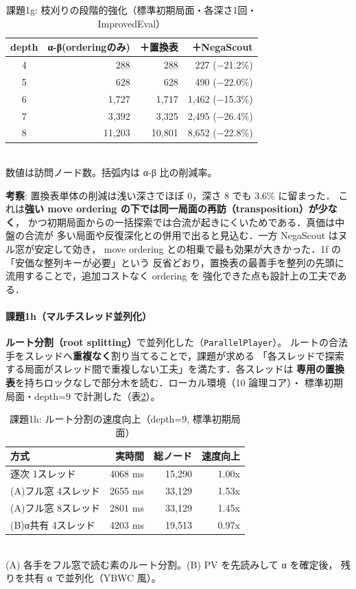 \documentclass[11pt,a4j]{ujarticle} %
\begin{document}
\begin{table}[h]\center
\caption{課題1g: 枝刈りの段階的強化（標準初期局面・各深さ1回・ImprovedEval）}\label{tab:1g}
\begin{tabular}{c|r|r|r}
depth & α-β(orderingのみ) & ＋置換表 & ＋NegaScout \\ \hline\hline
4 &    288 &    288 &   227 ($-$21.2\%) \\
5 &    628 &    628 &   490 ($-$22.0\%) \\
6 &  1{,}727 &  1{,}717 & 1{,}462 ($-$15.3\%) \\
7 &  3{,}392 &  3{,}325 & 2{,}495 ($-$26.4\%) \\
8 & 11{,}203 & 10{,}801 & 8{,}652 ($-$22.8\%) \\
\end{tabular}\\
{\small 数値は訪問ノード数。括弧内は α-β 比の削減率。}
\end{table}

\textbf{考察}: 置換表単体の削減は浅い深さでほぼ 0，深さ 8 でも 3.6\% に留まった．
これは\textbf{強い move ordering の下では同一局面の再訪（transposition）が少なく}，
かつ初期局面からの一括探索では合流が起きにくいためである．真価は中盤の合流が
多い局面や反復深化との併用で出ると見込む．一方 NegaScout はヌル窓が安定して効き，
move ordering との相乗で最も効果が大きかった．1f の「安価な整列キーが必要」という
反省どおり，置換表の最善手を整列の先頭に流用することで，追加コストなく ordering を
強化できた点も設計上の工夫である．

\paragraph{課題1h（マルチスレッド並列化）}
\textbf{ルート分割（root splitting）}で並列化した（{\verb+ParallelPlayer+}）。
ルートの合法手をスレッドへ\textbf{重複なく}割り当てることで，課題が求める
「各スレッドで探索する局面がスレッド間で重複しない工夫」を満たす．各スレッドは
\textbf{専用の置換表}を持ちロックなしで部分木を読む．ローカル環境（10 論理コア）・
標準初期局面・depth=9 で計測した（表\ref{tab:1h}）。

\begin{table}[h]\center
\caption{課題1h: ルート分割の速度向上（depth=9, 標準初期局面）}\label{tab:1h}
\begin{tabular}{l|r|r|r}
方式 & 実時間 & 総ノード & 速度向上 \\ \hline\hline
逐次 1スレッド            & 4068 ms & 15{,}290 & 1.00x \\
(A)フル窓 4スレッド       & 2655 ms & 33{,}129 & 1.53x \\
(A)フル窓 8スレッド       & 2801 ms & 33{,}129 & 1.45x \\
(B)α共有 4スレッド        & 4203 ms & 19{,}513 & 0.97x \\
\end{tabular}\\
{\small (A) 各手をフル窓で読む素のルート分割。(B) PV を先読みして α を確定後，
残りを共有 α で並列化（YBWC 風）。}
\end{table}
\end{document}
